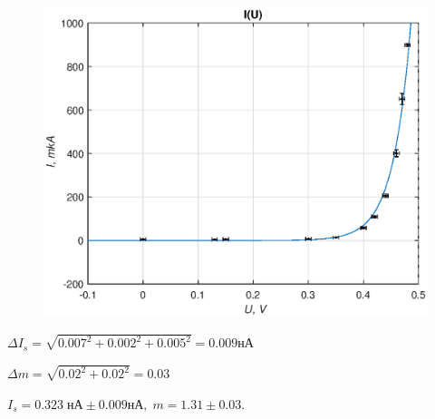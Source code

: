 \documentclass[12pt]{article}
\begin{document}
\begin{figure}[!ht]
    \centering
    \includegraphics[scale=0.7]{vac0.eps}
\end{figure}


$\Delta I_s = \sqrt{0.007^2 + 0.002^2 + 0.005^{2}} = 0.009$нА

$\Delta m = \sqrt{0.02^{2} + 0.02^{2}} = 0.03$

$I_s = 0.323\; \text{нА} \pm 0.009 \text{нА}, \; m = 1.31 \pm 0.03$.


\newpage
\end{document}
